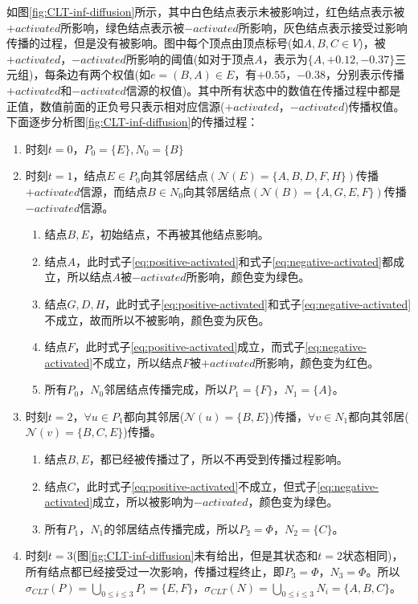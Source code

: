如图\ref{fig:CLT-inf-diffusion}所示，其中白色结点表示未被影响过，红色结点表示被$+activated$所影响，绿色结点表示被$-activated$所影响，灰色结点表示接受过影响传播的过程，但是没有被影响。图中每个顶点由顶点标号(如$A, B, C \in V$)，被$+activated$，$-activated$所影响的阈值(如对于顶点$A$，表示为$\{A, +0.12, -0.37\}$三元组)，每条边有两个权值(如$e = (B, A) \in E$，有$+0.55$，$-0.38$，分别表示传播$+activated$和$-activated$信源的权值)。其中所有状态中的数值在传播过程中都是正值，数值前面的正负号只表示相对应信源($+activated$，$-activated$)传播权值。下面逐步分析图\ref{fig:CLT-inf-diffusion}的传播过程：
\begin{enumerate}
\item 时刻$t=0$，$P_{0}=\{E\}, N_{0}=\{B\}$
\item 时刻$t=1$，结点$E \in P_{0}$向其邻居结点$(\mathcal{N}(E)=\{A, B, D, F, H\})$传播$+activated$信源，而结点$B \in N_{0}$向其邻居结点$(\mathcal{N}(B)=\{A, G, E, F\})$传播$-activated$信源。
	\begin{enumerate}
	\item 结点$B, E$，初始结点，不再被其他结点影响。
	\item 结点$A$，此时式子\ref{eq:positive-activated}和式子\ref{eq:negative-activated}都成立，所以结点$A$被$-activated$所影响，颜色变为绿色。
	\item 结点$G, D, H$，此时式子\ref{eq:positive-activated}和式子\ref{eq:negative-activated}不成立，故而所以不被影响，颜色变为灰色。
	\item 结点$F$，此时式子\ref{eq:positive-activated}成立，而式子\ref{eq:negative-activated}不成立，所以结点$F$被$+activated$所影响，颜色变为红色。
	\item 所有$P_{0}$，$N_{0}$邻居结点传播完成，所以$P_{1}=\{ F\}$，$N_{1}=\{A\}$。
	\end{enumerate}
\item 时刻$t=2$，$\forall u \in P_{1}$都向其邻居($\mathcal{N}(u)=\{B, E\}$)传播，$\forall v \in N_{1}$都向其邻居($\mathcal{N}(v)=\{B, C, E\}$)传播。
	\begin{enumerate}
	\item 结点$B, E$，都已经被传播过了，所以不再受到传播过程影响。
	\item 结点$C$，此时式子\ref{eq:positive-activated}不成立，但式子\ref{eq:negative-activated}成立，所以被影响为$-activated$，颜色变为绿色。
	\item 所有$P_{1}$，$N_{1}$的邻居结点传播完成，所以$P_{2}=\Phi$，$N_{2}=\{C\}$。
	\end{enumerate}
\item 时刻$t=3$(图\ref{fig:CLT-inf-diffusion}未有给出，但是其状态和$t=2$状态相同)，所有结点都已经接受过一次影响，传播过程终止，即$P_{3}=\Phi$，$N_{3}=\Phi$。所以$\sigma_{CLT}(P)=\bigcup_{0 \leq i \leq 3}P_{i}=\{E, F\}$，$\sigma_{CLT}(N)=\bigcup_{0 \leq i \leq 3}N_{i}=\{A, B, C\}$。
\end{enumerate}


